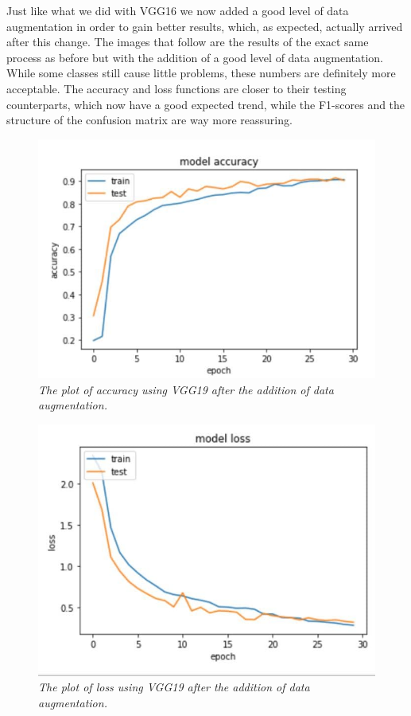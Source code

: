 \documentclass[12pt,a4paper]{report}
\begin{document}
Just like what we did with VGG16 we now added a good level of data augmentation in order to gain better results, which, as expected, actually arrived after this change. The images that follow are the results of the exact same process as before but with the addition of a good level of data augmentation. While some classes still cause little problems, these numbers are definitely more acceptable. The accuracy and loss functions are closer to their testing counterparts, which now have a good expected trend, while the F1-scores and the structure of the confusion matrix are way more reassuring.
\begin{figure}[H]
\centering
\includegraphics[scale=0.45]{./immagini/vgg19/2_data_augmentation_-_30_epochs_no_stopping_-_dropout_0p5_-_no_batch_norm/plot1.JPEG}
\caption{\textit{The plot of accuracy using VGG19 after the addition of data augmentation.}}
\end{figure}
\begin{figure}[H]
\centering
\includegraphics[scale=0.45]{./immagini/vgg19/2_data_augmentation_-_30_epochs_no_stopping_-_dropout_0p5_-_no_batch_norm/plot2.JPEG}
\caption{\textit{The plot of loss using VGG19 after the addition of data augmentation.}}
\end{figure}
\end{document}
